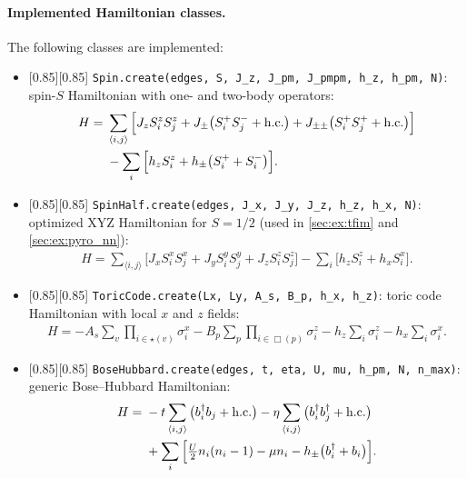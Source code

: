 \documentclass{SciPost}
\newcommand{\pyinline}[1]{\begingroup\setlength{\fboxsep}{0pt}%
  \colorbox{gray!15}{\raisebox{0pt}[0.85\ht\strutbox][0.85\dp\strutbox]{%
    \hspace{1pt}\lstinline{#1}\hspace{1pt}}}\endgroup}
\begin{document}
\paragraph{Implemented Hamiltonian classes.} The following classes are implemented:
\begin{itemize}
	\item \pyinline{Spin.create(edges, S, J_z, J_pm, J_pmpm, h_z, h_pm, N)}: spin-$S$ Hamiltonian with one- and two-body operators:
	\begin{align}
		H={}&\sum_{\langle i,j\rangle}\Big[J_z S_i^zS_j^z+J_{\pm}\big(S_i^+S_j^-+{\rm h.c.}\big)+J_{\pm\pm}\big(S_i^+S_j^++{\rm h.c.}\big)\Big]\notag\\
		&-\sum_i\Big[h_zS_i^z+h_{\pm}\big(S_i^++S_i^-\big)\Big].
		\label{eq:H_spin_generic}
	\end{align}

	\item \pyinline{SpinHalf.create(edges, J_x, J_y, J_z, h_z, h_x, N)}: optimized XYZ Hamiltonian for $S = 1/2$ (used in \autoref{sec:ex:tfim} and \autoref{sec:ex:pyro_nn}):
	\begin{align}
		H=\sum_{\langle i,j\rangle}\Big[J_xS_i^xS_j^x+J_yS_i^yS_j^y+J_zS_i^zS_j^z\Big]-\sum_i\Big[h_zS_i^z+h_xS_i^x\Big].
		\label{eq:H_spinhalf_generic}
	\end{align}

	\item \pyinline{ToricCode.create(Lx, Ly, A_s, B_p, h_x, h_z)}: toric code Hamiltonian with local $x$ and $z$ fields:
	\begin{align}
		H=-A_s\sum_v\prod_{i\in\star(v)}\sigma_i^x-B_p\sum_p\prod_{i\in\Box(p)}\sigma_i^z-h_z\sum_i\sigma_i^z-h_x\sum_i\sigma_i^x.
		\label{eq:H_toric_generic}
	\end{align}

	\item \pyinline{BoseHubbard.create(edges, t, eta, U, mu, h_pm, N, n_max)}: generic Bose--Hubbard Hamiltonian:
	\begin{align}
		H={}&-t\sum_{\langle i,j\rangle}\big(b_i^\dagger b_j+{\rm h.c.}\big)
		 -\eta\sum_{\langle i,j\rangle}\big(b_i^\dagger b_j^\dagger+{\rm h.c.}\big)\notag\\
		&+\sum_i\Big[\tfrac{U}{2}n_i(n_i-1)-\mu n_i-h_{\pm}\big(b_i^\dagger+b_i\big)\Big].
		\label{eq:H_bosehubbard}
	\end{align}


\end{itemize}
\end{document}
